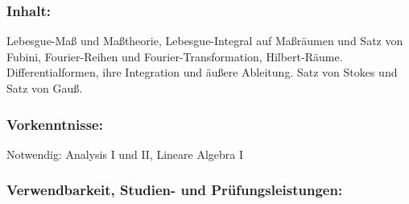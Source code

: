\documentclass[a4paper,10pt]{article}
\begin{document}
\subsubsection*{\large
    Inhalt:
}
Lebesgue-Maß und Maßtheorie, Lebesgue-Integral auf Maßräumen und Satz von Fubini, Fourier-Reihen und Fourier-Transformation, Hilbert-Räume.
Differentialformen, ihre Integration und äußere Ableitung. Satz von Stokes und Satz von Gauß.
\subsubsection*{\large
    Vorkenntnisse:
}
Notwendig: Analysis I und II, Lineare Algebra I
\cleardoublepage
\subsubsection*{\large
    Verwendbarkeit, Studien- und Prüfungsleistungen:
}
\end{document}
